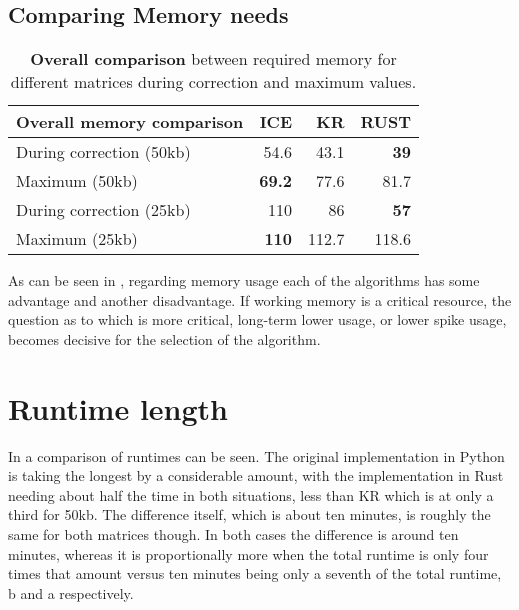 \subsection{Comparing Memory needs}\label{sec:compmemory}

\begin{table}[!htbp]
    \begin{tabular}{lrrr}
        \textbf{Overall memory comparison} & ICE & KR & RUST \\
        \midrule
        During correction (50kb) &   54.6 & 43.1 & \textbf{39}   \\
        Maximum          (50kb) &   \textbf{69.2} & 77.6 & 81.7 \\
        During correction (25kb) &   110 & 86 & \textbf{57}  \\
        Maximum          (25kb) &   \textbf{110} & 112.7 & 118.6 \\
    \end{tabular}
    \caption[Memory needs comparison]
    {\textbf{Overall comparison} between required memory for different
    matrices during correction and maximum values.}
    \label{tab:compmem}
\end{table}

As can be seen in , regarding memory usage each of the
algorithms has some advantage and another disadvantage. If working memory is a
critical resource, the question as to which is more critical, long-term lower
usage, or lower spike usage, becomes decisive for the selection of the
algorithm.




\section{Runtime length}\label{sec:runtime}



In  a comparison of runtimes can be seen. The original
implementation in Python is taking the longest by a considerable amount, with
the implementation in Rust needing about half the time in both situations, less
than KR which is at only a third for 50kb. The difference itself, which is
about ten minutes, is roughly the same for both matrices though. In both cases
the difference is around ten minutes, whereas it is proportionally more when
the total runtime is only four times that amount versus ten minutes being only
a seventh of the total runtime, b and a
respectively.


